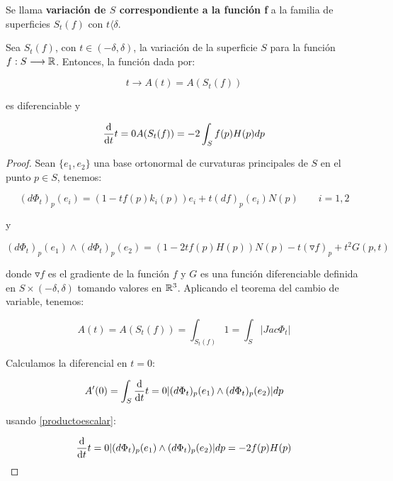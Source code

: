 Se llama \textbf{variación de $S$ correspondiente a la función f} a la familia de superficies $S_t(f)$ con $t  \langle  \delta$.

\begin{remark}
Sea $S_t(f)$, con $t \in (-\delta, \delta)$, la variación de la superficie $S$ para la función $f: S \longrightarrow \mathbb{R}$. Entonces, la función dada por:

\begin{equation*}
    t \longrightarrow A(t) = A(S_t(f))
\end{equation*}

es diferenciable y

\begin{equation}\label{variacionarea}
    \diff{}{t}{t=0} A(S_t(f)) = -2 \int_S f(p)H(p) dp
\end{equation}
\end{remark}
\begin{proof}
Sean $\{e_1, e_2\}$ una base ortonormal de curvaturas principales de $S$ en el punto $p \in S$, tenemos:

\begin{equation*}
    (d\Phi_t)_p(e_i) = (1 - tf(p)k_i(p))e_i + t(df)_p(e_i)N(p) \qquad i=1,2
\end{equation*}

y

\begin{equation}\label{productoescalar}
    (d\Phi_t)_p(e_1) \wedge (d\Phi_t)_p(e_2) = (1 - 2tf(p)H(p))N(p) - t(\triangledown f)_p + t^2G(p,t)
\end{equation}

donde $\triangledown f$ es el gradiente de la función $f$ y $G$ es una función diferenciable definida en $S \times (-\delta, \delta)$ tomando valores en $\mathbb{R}^3$. Aplicando el teorema del cambio de variable, tenemos:

\begin{equation*}
    A(t) = A(S_t(f)) = \int_{S_t(f)} 1 = \int_S |Jac \Phi_t|
\end{equation*}

Calculamos la diferencial en $t=0$:

\begin{equation*}
    A'(0) = \int_S \diff{}{t}{t=0} |(d\Phi_t)_p(e_1) \wedge (d\Phi_t)_p(e_2)|dp 
\end{equation*}

usando \autoref{productoescalar}:

\begin{equation*}
    \diff{}{t}{t=0} |(d\Phi_t)_p(e_1) \wedge (d\Phi_t)_p(e_2)|dp = -2f(p)H(p)
\end{equation*}
\end{proof}


